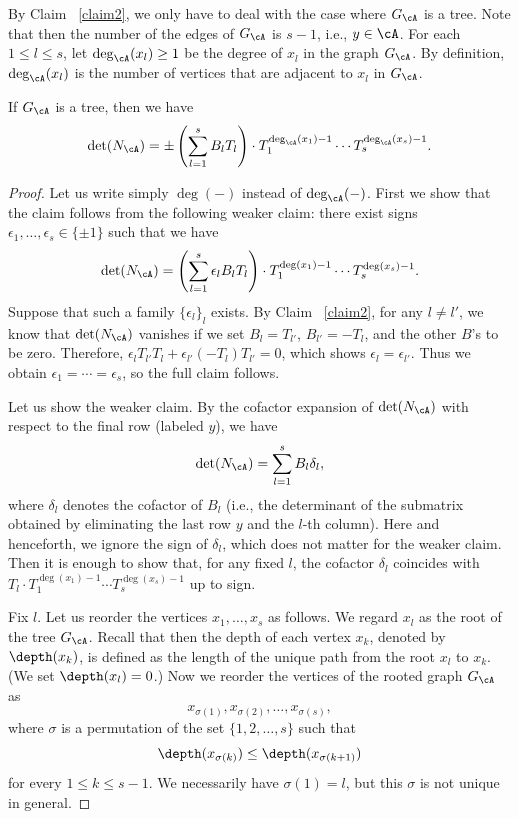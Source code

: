 By Claim ~\ref{claim2}, we only have to deal with the case where $G_{\cA}$ is a tree.
Note that then the number of the edges of $G_{\cA}$ is $s-1$, i.e., $y \in \cA$.
For each $1 \leq l \leq s$, let $\deg_{\cA}(x_l) \geq 1$ be the degree of $x_l$ in the graph $G_{\cA}$.
By definition, $\deg_{\cA}(x_l)$ is the number of vertices that are adjacent to $x_l$ in $G_{\cA}$.

\begin{claim}\label{claim3}
If $G_{\cA}$ is a tree, then we have
\[
\det(N_{\cA}) = \pm \left(\sum_{l = 1}^s B_l T_l \right) \cdot T_1^{\deg_{\cA}(x_1)-1} \cdots T_s^{\deg_{\cA}(x_s) - 1}.
\]
\end{claim}

\begin{proof}
Let us write simply $\deg(-)$ instead of $\deg_{\cA}(-)$.
First we show that the claim follows from the following weaker claim: there exist signs $\epsilon_1, \dots, \epsilon_s \in \{\pm 1\}$ such that we have
\[
\det(N_{\cA}) = \left(\sum_{l = 1}^s \epsilon_l B_l T_l \right) \cdot T_1^{\deg(x_1)-1} \cdots T_s^{\deg(x_s)-1}.
\]
Suppose that such a family $\{\epsilon_l\}_l$ exists.
By Claim ~\ref{claim2}, for any $l \neq l'$, we know that $\det(N_{\cA})$ vanishes if we set $B_l = T_{l'}$, $B_{l'} = -T_l$, and the other $B$'s to be zero.
Therefore, $\epsilon_l T_{l'} T_l + \epsilon_{l'} (-T_l) T_{l'} = 0$, which shows $\epsilon_l = \epsilon_{l'}$.
Thus we obtain $\epsilon_1 = \cdots = \epsilon_s$, so the full claim follows.

Let us show the weaker claim.
By the cofactor expansion of $\det(N_{\cA})$ with respect to the final row (labeled $y$), we have
\[
\det(N_{\cA})
= \sum_{l = 1}^s B_l \delta_l,
\]
where $\delta_l$ denotes the cofactor of $B_l$ (i.e., the determinant of the submatrix obtained by eliminating the last row $y$ and the $l$-th column).
Here and henceforth, we ignore the sign of $\delta_l$, which does not matter for the weaker claim.
Then it is enough to show that, for any fixed $l$, the cofactor $\delta_l$ coincides with $T_l \cdot T_1^{\deg(x_1)-1} \cdots T_s^{\deg(x_s)-1}$ up to sign.

Fix $l$.
Let us reorder the vertices $x_1, \dots, x_s$ as follows.
We regard $x_l$ as the root of the tree $G_{\cA}$.
Recall that then the depth of each vertex $x_k$, denoted by $\depth(x_k)$, is defined as the length of the unique path from the root $x_l$ to $x_k$.
(We set $\depth(x_l) = 0$.)
Now we reorder the vertices of the rooted graph $G_{\cA}$ as
\[
x_{\sigma(1)}, x_{\sigma(2)}, \dots, x_{\sigma(s)},
\]
where $\sigma$ is a permutation of the set $\{1, 2, \dots, s\}$ such that 
\[
\depth(x_{\sigma(k)}) \leq  \depth(x_{\sigma(k+1)})
\]
for every $1 \leq k \leq s - 1$.
We necessarily have $\sigma(1) = l$, but this $\sigma$ is not unique in general.


\end{proof}
